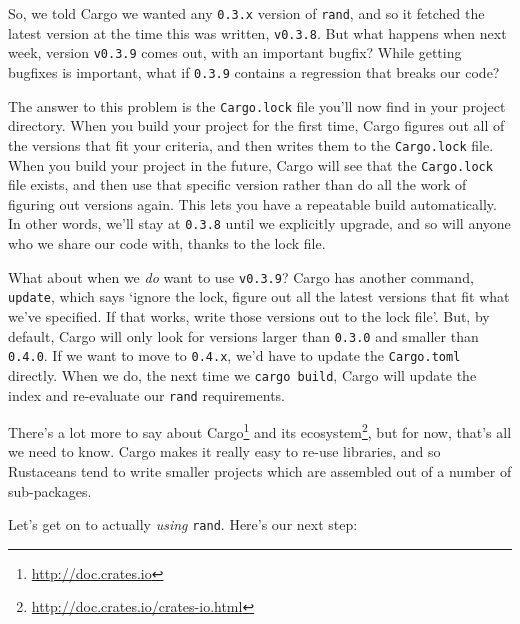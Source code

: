 \documentclass[a4paper,]{book}
\renewcommand{\href}[2]{#2\footnote{\url{#1}}}
\begin{document}
So, we told Cargo we wanted any \texttt{0.3.x} version of \texttt{rand},
and so it fetched the latest version at the time this was written,
\texttt{v0.3.8}. But what happens when next week, version
\texttt{v0.3.9} comes out, with an important bugfix? While getting
bugfixes is important, what if \texttt{0.3.9} contains a regression that
breaks our code?

The answer to this problem is the \texttt{Cargo.lock} file you'll now
find in your project directory. When you build your project for the
first time, Cargo figures out all of the versions that fit your
criteria, and then writes them to the \texttt{Cargo.lock} file. When you
build your project in the future, Cargo will see that the
\texttt{Cargo.lock} file exists, and then use that specific version
rather than do all the work of figuring out versions again. This lets
you have a repeatable build automatically. In other words, we'll stay at
\texttt{0.3.8} until we explicitly upgrade, and so will anyone who we
share our code with, thanks to the lock file.

What about when we \emph{do} want to use \texttt{v0.3.9}? Cargo has
another command, \texttt{update}, which says `ignore the lock, figure
out all the latest versions that fit what we've specified. If that
works, write those versions out to the lock file'. But, by default,
Cargo will only look for versions larger than \texttt{0.3.0} and smaller
than \texttt{0.4.0}. If we want to move to \texttt{0.4.x}, we'd have to
update the \texttt{Cargo.toml} directly. When we do, the next time we
\texttt{cargo\ build}, Cargo will update the index and re-evaluate our
\texttt{rand} requirements.

There's a lot more to say about \href{http://doc.crates.io}{Cargo} and
\href{http://doc.crates.io/crates-io.html}{its ecosystem}, but for now,
that's all we need to know. Cargo makes it really easy to re-use
libraries, and so Rustaceans tend to write smaller projects which are
assembled out of a number of sub-packages.

Let's get on to actually \emph{using} \texttt{rand}. Here's our next
step:
\end{document}
